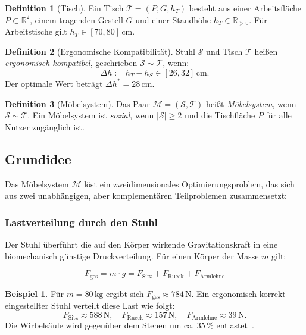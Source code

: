 \documentclass[a4paper,12pt]{article}
\theoremstyle{definition}
\newtheorem{definition}{Definition}
\newtheorem{beispiel}{Beispiel}
\begin{document}
\begin{definition}[Tisch]
	Ein Tisch $\mathcal{T} = (P, G, h_T)$ besteht aus einer Arbeitsfl\"{a}che $P \subset \mathbb{R}^2$,
	einem tragenden Gestell $G$ und einer Standh\"{o}he $h_T \in \mathbb{R}_{>0}$.
	F\"{u}r Arbeitstische gilt $h_T \in [70, 80]\,\mathrm{cm}$.
\end{definition}

\begin{definition}[Ergonomische Kompatibilit\"{a}t]
	Stuhl $\mathcal{S}$ und Tisch $\mathcal{T}$ hei\ss{}en \emph{ergonomisch kompatibel},
	geschrieben $\mathcal{S} \sim \mathcal{T}$, wenn:
	\[
		\Delta h := h_T - h_S \in [26, 32]\,\mathrm{cm}.
	\]
	Der optimale Wert betr\"{a}gt $\Delta h^* = 28\,\mathrm{cm}$.
\end{definition}

\begin{definition}[M\"{o}belsystem]
	Das Paar $\mathcal{M} = (\mathcal{S}, \mathcal{T})$ hei\ss{}t \emph{M\"{o}belsystem}, wenn
	$\mathcal{S} \sim \mathcal{T}$. Ein M\"{o}belsystem ist \emph{sozial}, wenn
	$|\mathcal{S}| \geq 2$ und die Tischfl\"{a}che $P$ f\"{u}r alle Nutzer zug\"{a}nglich ist.
\end{definition}

\subsection{Grundidee}

Das M\"{o}belsystem $\mathcal{M}$ l\"{o}st ein zweidimensionales Optimierungsproblem, das sich aus
zwei unabh\"{a}ngigen, aber komplement\"{a}ren Teilproblemen zusammensetzt:

\subsubsection{Lastverteilung durch den Stuhl}

Der Stuhl \"{u}berf\"{u}hrt die auf den K\"{o}rper wirkende Gravitationskraft in eine biomechanisch
g\"{u}nstige Druckverteilung. F\"{u}r einen K\"{o}rper der Masse $m$ gilt:

\[
	F_{\mathrm{ges}} = m \cdot g
	= F_{\mathrm{Sitz}} + F_{\mathrm{Rueck}} + F_{\mathrm{Armlehne}}
\]

\begin{beispiel}
	F\"{u}r $m = 80\,\mathrm{kg}$ ergibt sich $F_{\mathrm{ges}} \approx 784\,\mathrm{N}$.
	Ein ergonomisch korrekt eingestellter Stuhl verteilt diese Last wie folgt:
	\[
		F_{\mathrm{Sitz}} \approx 588\,\mathrm{N}, \quad
		F_{\mathrm{Rueck}} \approx 157\,\mathrm{N}, \quad
		F_{\mathrm{Armlehne}} \approx 39\,\mathrm{N}.
	\]
	Die Wirbels\"{a}ule wird gegen\"{u}ber dem Stehen um ca. $35\,\%$ entlastet~\cite{Nachemson1966}.
\end{beispiel}
\end{document}
